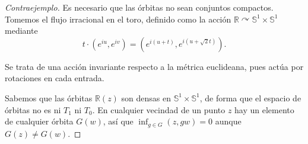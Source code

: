 \documentclass[spanish]{article}
\theoremstyle{definition}
\newcommand{\R}{\mathbb{R}}
\newcommand{\SP}{\mathbb{S}}
\begin{document}
	\begin{proof}[Contraejemplo]
		Es necesario que las órbitas no sean conjuntos compactos. Tomemos el flujo irracional en el toro, definido como la acción $\R\curvearrowright\SP^1\times\SP^1$ mediante \[t\cdot(e^{iu},e^{iv})=(e^{i(u+t)},e^{i(u+\sqrt{2}t)}).\]
		
		Se trata de una acción invariante respecto a la métrica euclideana, pues actúa por rotaciones en cada entrada.
		
		Sabemos que las órbitas $\R(z)$ son densas en $\SP^1\times\SP^1$, de forma que el espacio de órbitas no es ni $T_1$ ni $T_0$. En cualquier vecindad de un punto $z$ hay un elemento de cualquier órbita $G(w)$, así que $\inf_{g\in G} (z,gw)=0$ aunque $G(z)\neq G(w)$.
	\end{proof}
\end{document}
